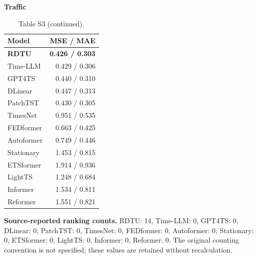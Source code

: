 \begin{table}[H]\centering\small
\caption*{Table S3 (continued).}
\begin{minipage}[t]{0.48\linewidth}\vspace{0pt}\centering\small
\textbf{Traffic}\par\smallskip
\begin{tabular}{lr}\toprule Model & MSE / MAE\\\midrule
\rowcolor{blue!5}
\textbf{RDTU} & \textbf{0.426 / 0.303}\\
Time-LLM & 0.429 / 0.306\\
GPT4TS & 0.440 / 0.310\\
DLinear & 0.447 / 0.313\\
PatchTST & 0.430 / 0.305\\
TimesNet & 0.951 / 0.535\\
FEDformer & 0.663 / 0.425\\
Autoformer & 0.749 / 0.446\\
Stationary & 1.453 / 0.815\\
ETSformer & 1.914 / 0.936\\
LightTS & 1.248 / 0.684\\
Informer & 1.534 / 0.811\\
Reformer & 1.551 / 0.821\\
\bottomrule\end{tabular}\end{minipage}
\end{table}
\noindent\textbf{Source-reported ranking counts.} RDTU: 14, Time-LLM: 0, GPT4TS: 0, DLinear: 0, PatchTST: 0, TimesNet: 0, FEDformer: 0, Autoformer: 0, Stationary: 0, ETSformer: 0, LightTS: 0, Informer: 0, Reformer: 0. The original counting convention is not specified; these values are retained without recalculation.\par
